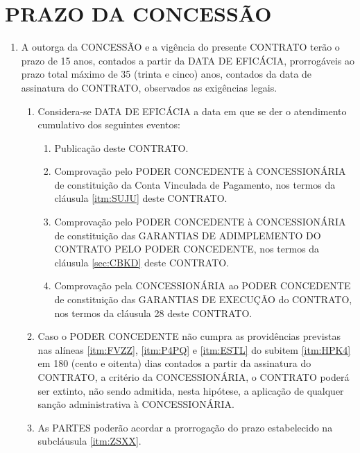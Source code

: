 \documentclass[a4paper,11pt]{report} %
\begin{document}
\section{PRAZO DA CONCESSÃO}
\label{sec:HWPQ}
\begin{enumerate}
\item \label{itm:8UN6} A outorga da CONCESSÃO e a vigência do presente CONTRATO terão o prazo de 15 anos, contados a partir da DATA DE EFICÁCIA, prorrogáveis ao prazo total máximo de 35 (trinta e cinco) anos, contados da data de assinatura do CONTRATO, observados as exigências legais.

\begin{enumerate}[label*=\arabic*.]
\item \label{itm:HPK4} Considera-se DATA DE EFICÁCIA a data em que se der o atendimento cumulativo dos seguintes eventos: 

\begin{enumerate}[label*=\arabic*.]
\item \label{itm:FVZZ} Publicação deste CONTRATO.
\item \label{itm:P4PQ} Comprovação pelo PODER CONCEDENTE à CONCESSIONÁRIA de constituição da Conta Vinculada de Pagamento, nos termos da cláusula \ref{itm:SUJU} deste CONTRATO.
\item \label{itm:ESTL} Comprovação pelo PODER CONCEDENTE à CONCESSIONÁRIA de constituição das GARANTIAS DE ADIMPLEMENTO DO CONTRATO PELO PODER CONCEDENTE, nos termos da cláusula \ref{sec:CBKD} deste CONTRATO.
\item \label{itm:6Z8J} Comprovação pela CONCESSIONÁRIA ao PODER CONCEDENTE de constituição das GARANTIAS DE EXECUÇÃO do CONTRATO, nos termos da cláusula 28 deste CONTRATO.
\end{enumerate}

\item \label{itm:ZSXX} Caso o PODER CONCEDENTE não cumpra as providências previstas nas alíneas \ref{itm:FVZZ}, \ref{itm:P4PQ} e \ref{itm:ESTL} do subitem \ref{itm:HPK4} em 180 (cento e oitenta) dias contados a partir da assinatura do CONTRATO, a critério da CONCESSIONÁRIA, o CONTRATO poderá ser extinto, não sendo admitida, nesta hipótese, a aplicação de qualquer sanção administrativa à CONCESSIONÁRIA.
\item \label{itm:7CSU} As PARTES poderão acordar a prorrogação do prazo estabelecido na subcláusula \ref{itm:ZSXX}.

\end{enumerate}
\end{enumerate}
\end{document}
